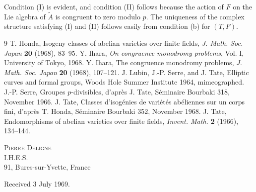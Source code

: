 \documentclass[10pt]{amsart}
\theoremstyle{plain}
\theoremstyle{remark}
\begin{document}
Condition (I) is evident, and condition (II) follows because the action of $F$ on the Lie algebra of $\widetilde A$ is congruent to zero modulo $p$. The uniqueness of the complex structure satisfying (I) and (II) follows easily from condition (b) for $(T,F)$.

\begin{thebibliography}{9}
 T. Honda, Isogeny classes of abelian varieties over finite fields, \textit{J. Math. Soc. Japan} \textbf{20} (1968), 83--95.
 Y. Ihara, \textit{On congruence monodromy problems}, Vol. I, University of Tokyo, 1968.
 Y. Ihara, The congruence monodromy problems, \textit{J. Math. Soc. Japan} \textbf{20} (1968), 107--121.
 J. Lubin, J.-P. Serre, and J. Tate, Elliptic curves and formal groups, Woods Hole Summer Institute 1964, mimeographed.
 J.-P. Serre, Groupes $p$-divisibles, d'après J. Tate, Séminaire Bourbaki 318, November 1966.
 J. Tate, Classes d'isogénies de variétés abéliennes sur un corps fini, d'après T. Honda, Séminaire Bourbaki 352, November 1968.
 J. Tate, Endomorphisms of abelian varieties over finite fields, \textit{Invent. Math.} \textbf{2} (1966), 134--144.
\end{thebibliography}

\begin{flushright}
\textsc{Pierre Deligne}\\
I.H.E.S.\\
91, Bures-sur-Yvette, France
\end{flushright}

\begin{flushright}
Received 3 July 1969.
\end{flushright}
\end{document}
